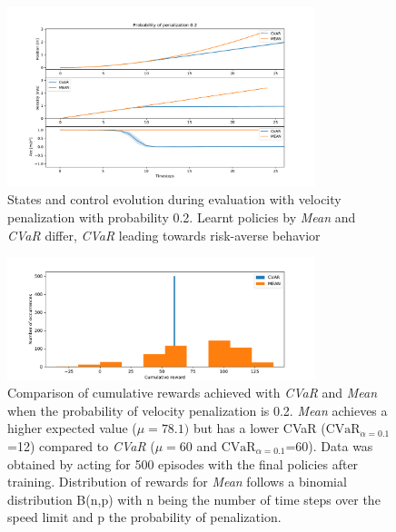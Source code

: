\begin{figure}[ht]
        \centering
        \includegraphics[width=0.8\textwidth]{images/Car/CVAR/Trajectory_withstds_penal.pdf}
        \caption{States and control evolution during evaluation with velocity penalization
        with probability 0.2.
        Learnt policies by \textit{Mean} and \textit{CVaR} differ, \textit{CVaR} leading
        towards risk-averse behavior}
        \label{fig:traj_probpenal0.2}
    
\end{figure}


\begin{figure}[ht]
        \centering
        \includegraphics[width=0.8\textwidth]{images/Car/histogram_rewards1vs01.pdf}
        \caption{Comparison of cumulative rewards achieved with \textit{CVaR} and \textit{Mean}
        when the probability of velocity penalization is 0.2.
        \textit{Mean} achieves a higher expected value  ($\mu=78.1)$  but 
        has a lower CVaR ($\text{CVaR}_{\alpha= 0.1}$=12) compared to
        \textit{CVaR} ($\mu=60$ and $\text{CVaR}_{\alpha= 0.1}$=60).
        Data was obtained by acting for 500 episodes with the final policies after training.
        Distribution of rewards for \textit{Mean} follows a binomial distribution B(n,p)
        with n being the number of time steps over the speed limit and 
        p the probability of penalization.}
        \label{fig:histogram_cvar_vs_mean}
    
\end{figure}


